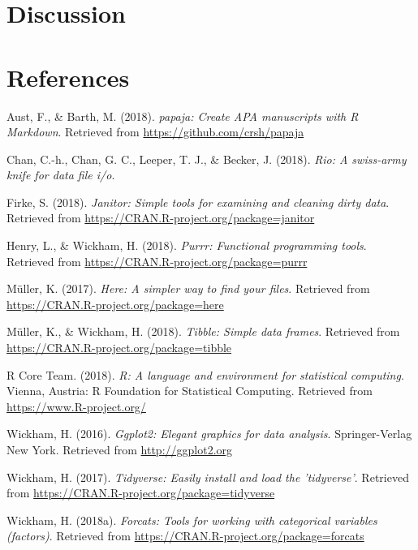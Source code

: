 \documentclass[man]{apa6}
\begin{document}
\section{Discussion}\label{discussion}

\newpage

\section{References}\label{references}

\begingroup
\setlength{\parindent}{-0.5in} \setlength{\leftskip}{0.5in}

\hypertarget{refs}{}
\hypertarget{ref-R-papaja}{}
Aust, F., \& Barth, M. (2018). \emph{papaja: Create APA manuscripts with
R Markdown}. Retrieved from \url{https://github.com/crsh/papaja}

\hypertarget{ref-R-rio}{}
Chan, C.-h., Chan, G. C., Leeper, T. J., \& Becker, J. (2018).
\emph{Rio: A swiss-army knife for data file i/o}.

\hypertarget{ref-R-janitor}{}
Firke, S. (2018). \emph{Janitor: Simple tools for examining and cleaning
dirty data}. Retrieved from
\url{https://CRAN.R-project.org/package=janitor}

\hypertarget{ref-R-purrr}{}
Henry, L., \& Wickham, H. (2018). \emph{Purrr: Functional programming
tools}. Retrieved from \url{https://CRAN.R-project.org/package=purrr}

\hypertarget{ref-R-here}{}
Müller, K. (2017). \emph{Here: A simpler way to find your files}.
Retrieved from \url{https://CRAN.R-project.org/package=here}

\hypertarget{ref-R-tibble}{}
Müller, K., \& Wickham, H. (2018). \emph{Tibble: Simple data frames}.
Retrieved from \url{https://CRAN.R-project.org/package=tibble}

\hypertarget{ref-R-base}{}
R Core Team. (2018). \emph{R: A language and environment for statistical
computing}. Vienna, Austria: R Foundation for Statistical Computing.
Retrieved from \url{https://www.R-project.org/}

\hypertarget{ref-R-ggplot2}{}
Wickham, H. (2016). \emph{Ggplot2: Elegant graphics for data analysis}.
Springer-Verlag New York. Retrieved from \url{http://ggplot2.org}

\hypertarget{ref-R-tidyverse}{}
Wickham, H. (2017). \emph{Tidyverse: Easily install and load the
'tidyverse'}. Retrieved from
\url{https://CRAN.R-project.org/package=tidyverse}

\hypertarget{ref-R-forcats}{}
Wickham, H. (2018a). \emph{Forcats: Tools for working with categorical
variables (factors)}. Retrieved from
\url{https://CRAN.R-project.org/package=forcats}
\end{document}
